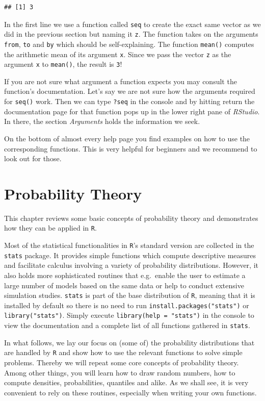 \documentclass[]{book}
\theoremstyle{definition}
\theoremstyle{definition}
\theoremstyle{definition}
\theoremstyle{remark}
\begin{document}
\begin{verbatim}
## [1] 3
\end{verbatim}

In the first line we use a function called \texttt{seq} to create the
exact same vector as we did in the previous section but naming it
\texttt{z}. The function takes on the arguments \texttt{from},
\texttt{to} and \texttt{by} which should be self-explaining. The
function \texttt{mean()} computes the arithmetic mean of its argument
\texttt{x}. Since we pass the vector \texttt{z} as the argument
\texttt{x} to \texttt{mean()}, the result is \texttt{3}!

If you are not sure what argument a function expects you may consult the
function's documentation. Let's say we are not sure how the arguments
required for \texttt{seq()} work. Then we can type \texttt{?seq} in the
console and by hitting return the documentation page for that function
pops up in the lower right pane of \emph{RStudio}. In there, the section
\emph{Arguments} holds the information we seek.

On the bottom of almost every help page you find examples on how to use
the corresponding functions. This is very helpful for beginners and we
recommend to look out for those.

\chapter{Probability Theory}\label{probability-theory}

This chapter reviews some basic concepts of probability theory and
demonstrates how they can be applied in \texttt{R}.

Most of the statistical functionalities in \texttt{R}'s standard version
are collected in the \texttt{stats} package. It provides simple
functions which compute descriptive measures and facilitate calculus
involving a variety of probability distributions. However, it also holds
more sophisticated routines that e.g.~enable the user to estimate a
large number of models based on the same data or help to conduct
extensive simulation studies. \texttt{stats} is part of the base
distribution of \texttt{R}, meaning that it is installed by default so
there is no need to run \texttt{install.packages("stats")} or
\texttt{library("stats")}. Simply execute
\texttt{library(help\ =\ "stats")} in the console to view the
documentation and a complete list of all functions gathered in
\texttt{stats}.

In what follows, we lay our focus on (some of) the probability
distributions that are handled by \texttt{R} and show how to use the
relevant functions to solve simple problems. Thereby we will repeat some
core concepts of probability theory. Among other things, you will learn
how to draw random numbers, how to compute densities, probabilities,
quantiles and alike. As we shall see, it is very convenient to rely on
these routines, especially when writing your own functions.
\end{document}
